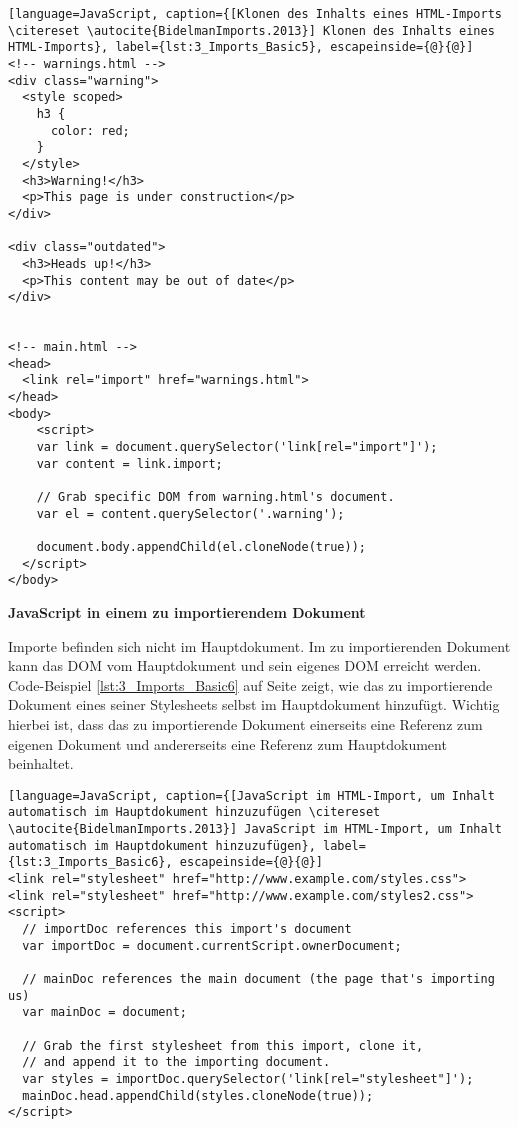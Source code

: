 \begin{lstlisting}[language=JavaScript, caption={[Klonen des Inhalts eines HTML-Imports \citereset \autocite{BidelmanImports.2013}] Klonen des Inhalts eines HTML-Imports}, label={lst:3_Imports_Basic5}, escapeinside={@}{@}]
<!-- warnings.html -->
<div class="warning">
  <style scoped>
    h3 {
      color: red;
    }
  </style>
  <h3>Warning!</h3>
  <p>This page is under construction</p>
</div>

<div class="outdated">
  <h3>Heads up!</h3>
  <p>This content may be out of date</p>
</div>


<!-- main.html -->
<head>
  <link rel="import" href="warnings.html">
</head>
<body>
    <script>
    var link = document.querySelector('link[rel="import"]');
    var content = link.import;

    // Grab specific DOM from warning.html's document.
    var el = content.querySelector('.warning');

    document.body.appendChild(el.cloneNode(true));
  </script>
</body>
\end{lstlisting}

\textbf{JavaScript in einem zu importierendem Dokument}

Importe befinden sich nicht im Hauptdokument.
Im zu importierenden Dokument kann das DOM vom Hauptdokument und sein eigenes DOM erreicht werden. Code-Beispiel \ref{lst:3_Imports_Basic6} auf Seite \pageref{lst:3_Imports_Basic6} zeigt, wie das zu importierende Dokument eines seiner Stylesheets selbst im Hauptdokument hinzufügt. Wichtig hierbei ist, dass das zu importierende Dokument einerseits eine Referenz zum eigenen Dokument und andererseits eine Referenz zum Hauptdokument beinhaltet.

\begin{lstlisting}[language=JavaScript, caption={[JavaScript im HTML-Import, um Inhalt automatisch im Hauptdokument hinzuzufügen \citereset \autocite{BidelmanImports.2013}] JavaScript im HTML-Import, um Inhalt automatisch im Hauptdokument hinzuzufügen}, label={lst:3_Imports_Basic6}, escapeinside={@}{@}]
<link rel="stylesheet" href="http://www.example.com/styles.css">
<link rel="stylesheet" href="http://www.example.com/styles2.css">
<script>
  // importDoc references this import's document
  var importDoc = document.currentScript.ownerDocument;

  // mainDoc references the main document (the page that's importing us)
  var mainDoc = document;

  // Grab the first stylesheet from this import, clone it,
  // and append it to the importing document.
  var styles = importDoc.querySelector('link[rel="stylesheet"]');
  mainDoc.head.appendChild(styles.cloneNode(true));
</script>
\end{lstlisting}

